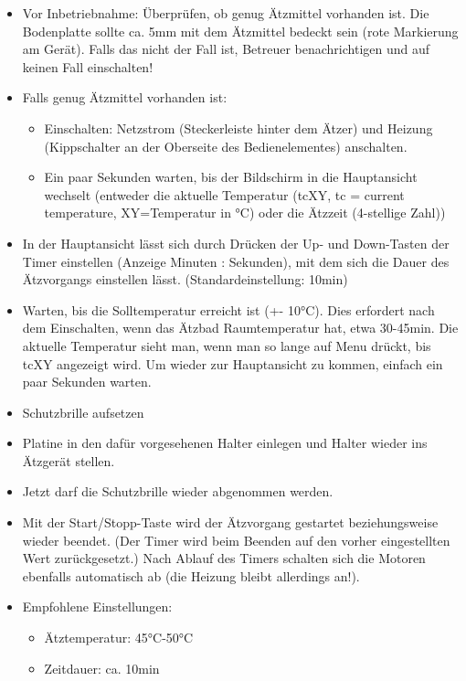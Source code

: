 \documentclass{\basedir/fablab-document}
\begin{document}
\begin{itemize}
\item Vor Inbetriebnahme: Überprüfen, ob genug Ätzmittel vorhanden ist. Die Bodenplatte sollte ca. 5mm mit dem Ätzmittel bedeckt sein (rote Markierung am Gerät). Falls das nicht der Fall ist, Betreuer benachrichtigen und auf keinen Fall einschalten!
\item Falls genug Ätzmittel vorhanden ist:
\begin{itemize}
\item Einschalten:  Netzstrom (Steckerleiste hinter dem Ätzer) und Heizung (Kippschalter an der Oberseite des Bedienelementes) anschalten.
\item Ein paar Sekunden warten, bis der Bildschirm in die Hauptansicht wechselt (entweder die aktuelle Temperatur (tcXY, tc = current temperature, XY=Temperatur in °C) oder die Ätzzeit (4-stellige Zahl))
\end{itemize}
\item In der Hauptansicht lässt sich durch Drücken der Up- und Down-Tasten der Timer einstellen (Anzeige Minuten : Sekunden), mit dem sich die Dauer des Ätzvorgangs einstellen lässt. (Standardeinstellung: 10min)
\item Warten, bis die Solltemperatur erreicht ist (+- 10°C). Dies erfordert nach dem Einschalten, wenn das Ätzbad Raumtemperatur hat, etwa 30-45min. Die aktuelle Temperatur sieht man, wenn man so lange auf Menu drückt, bis tcXY angezeigt wird. Um wieder zur Hauptansicht zu kommen, einfach ein paar Sekunden warten.
\item Schutzbrille aufsetzen
\item Platine in den dafür vorgesehenen Halter einlegen und Halter wieder ins Ätzgerät stellen.
\item Jetzt darf die Schutzbrille wieder abgenommen werden.
\item Mit der Start/Stopp-Taste wird der Ätzvorgang gestartet beziehungsweise wieder beendet. (Der Timer wird beim Beenden auf den vorher eingestellten Wert zurückgesetzt.) Nach Ablauf des Timers schalten sich die Motoren ebenfalls automatisch ab (die Heizung bleibt allerdings an!).

\item Empfohlene Einstellungen:
\begin{itemize}
\item Ätztemperatur: 45°C-50°C
\item Zeitdauer: ca. 10min
\end{itemize}


\end{itemize}
\end{document}

